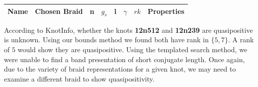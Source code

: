 \documentclass[12pt]{thesis}
\begin{document}
\small
\begin{singlespace}

\begin{center}
\begin{longtable}{ | l | l | c | c | c | c | c | l |}
    \hline
    Name & Chosen Braid & n & $g_{s}$ & l & $\gamma$ & $rk$ & Properties \\
    \hline 
    
    \hline 
\end{longtable}
\end{center}

\end{singlespace}
\normalsize

According to KnotInfo, whether the knots \textbf{12n512} and \textbf{12n239}
are quasipositive is unknown.
Using our bounds method we found both have rank in $\{ 5, 7 \}$.
A rank of $5$ would show they are quasipositive.
Using the templated search method, we were unable
to find a band presentation of short conjugate length.
Once again, due to the variety of braid representations
for a given knot, we may need to examine a different braid to show quasipositivity.




\end{document}
